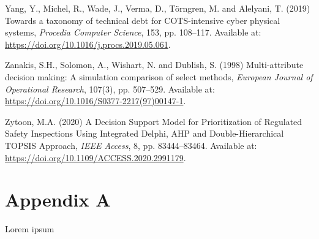 \documentclass[
  british,
  12pt,
  a4paper,
]{report}
\newlength{\cslhangindent}
\newenvironment{CSLReferences}[2] %
 {\begin{list}{}{%
  \setlength{\itemindent}{0pt}
  \setlength{\leftmargin}{0pt}
  \setlength{\parsep}{0pt}
  \ifodd #1
   \setlength{\leftmargin}{\cslhangindent}
   \setlength{\itemindent}{-1\cslhangindent}
  \fi
  \setlength{\itemsep}{#2\baselineskip}}}
 {\end{list}}
\let\cleardoublepage\clearpage
\begin{document}
\begin{CSLReferences}{0}{1}
Yang, Y., Michel, R., Wade, J., Verma, D., Törngren, M. and Alelyani, T.
(2019) \textquotesingle Towards a taxonomy of technical debt for
{COTS-intensive} cyber physical systems\textquotesingle, \emph{Procedia
Computer Science}, 153, pp. 108--117. Available at:
\url{https://doi.org/10.1016/j.procs.2019.05.061}.

Zanakis, S.H., Solomon, A., Wishart, N. and Dublish, S. (1998)
\textquotesingle Multi-attribute decision making: {A} simulation
comparison of select methods\textquotesingle, \emph{European Journal of
Operational Research}, 107(3), pp. 507--529. Available at:
\url{https://doi.org/10.1016/S0377-2217(97)00147-1}.

Zytoon, M.A. (2020) \textquotesingle A {Decision Support Model} for
{Prioritization} of {Regulated Safety Inspections Using Integrated
Delphi}, {AHP} and {Double-Hierarchical TOPSIS
Approach}\textquotesingle, \emph{IEEE Access}, 8, pp. 83444--83464.
Available at: \url{https://doi.org/10.1109/ACCESS.2020.2991179}.

\end{CSLReferences}

\cleardoublepage
{}
{}
\appendix

\chapter{Appendix A}\label{appendix-a}

Lorem ipsum
\end{document}
